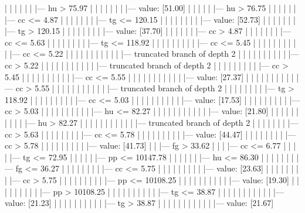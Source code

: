 \documentclass[UTF8, a4paper]{ctexart}
\begin{document}
|   |   |   |   |   |   |--- hu >  75.97
|   |   |   |   |   |   |   |--- value: [51.00]
|   |   |   |   |   |--- hu >  76.75
|   |   |   |   |   |   |--- cc <= 4.87
|   |   |   |   |   |   |   |--- tg <= 120.15
|   |   |   |   |   |   |   |   |--- value: [52.73]
|   |   |   |   |   |   |   |--- tg >  120.15
|   |   |   |   |   |   |   |   |--- value: [37.70]
|   |   |   |   |   |   |--- cc >  4.87
|   |   |   |   |   |   |   |--- cc <= 5.63
|   |   |   |   |   |   |   |   |--- tg <= 118.92
|   |   |   |   |   |   |   |   |   |--- cc <= 5.45
|   |   |   |   |   |   |   |   |   |   |--- cc <= 5.22
|   |   |   |   |   |   |   |   |   |   |   |--- truncated branch of depth 2
|   |   |   |   |   |   |   |   |   |   |--- cc >  5.22
|   |   |   |   |   |   |   |   |   |   |   |--- truncated branch of depth 2
|   |   |   |   |   |   |   |   |   |--- cc >  5.45
|   |   |   |   |   |   |   |   |   |   |--- cc <= 5.55
|   |   |   |   |   |   |   |   |   |   |   |--- value: [27.37]
|   |   |   |   |   |   |   |   |   |   |--- cc >  5.55
|   |   |   |   |   |   |   |   |   |   |   |--- truncated branch of depth 2
|   |   |   |   |   |   |   |   |--- tg >  118.92
|   |   |   |   |   |   |   |   |   |--- cc <= 5.03
|   |   |   |   |   |   |   |   |   |   |--- value: [17.53]
|   |   |   |   |   |   |   |   |   |--- cc >  5.03
|   |   |   |   |   |   |   |   |   |   |--- hu <= 82.27
|   |   |   |   |   |   |   |   |   |   |   |--- value: [21.80]
|   |   |   |   |   |   |   |   |   |   |--- hu >  82.27
|   |   |   |   |   |   |   |   |   |   |   |--- truncated branch of depth 2
|   |   |   |   |   |   |   |--- cc >  5.63
|   |   |   |   |   |   |   |   |--- cc <= 5.78
|   |   |   |   |   |   |   |   |   |--- value: [44.47]
|   |   |   |   |   |   |   |   |--- cc >  5.78
|   |   |   |   |   |   |   |   |   |--- value: [41.73]
|   |   |--- fg >  33.62
|   |   |   |--- cc <= 6.77
|   |   |   |   |--- tg <= 72.95
|   |   |   |   |   |--- pp <= 10147.78
|   |   |   |   |   |   |--- hu <= 86.30
|   |   |   |   |   |   |   |--- fg <= 36.27
|   |   |   |   |   |   |   |   |--- cc <= 5.75
|   |   |   |   |   |   |   |   |   |--- value: [23.63]
|   |   |   |   |   |   |   |   |--- cc >  5.75
|   |   |   |   |   |   |   |   |   |--- pp <= 10108.25
|   |   |   |   |   |   |   |   |   |   |--- value: [19.30]
|   |   |   |   |   |   |   |   |   |--- pp >  10108.25
|   |   |   |   |   |   |   |   |   |   |--- tg <= 38.87
|   |   |   |   |   |   |   |   |   |   |   |--- value: [21.23]
|   |   |   |   |   |   |   |   |   |   |--- tg >  38.87
|   |   |   |   |   |   |   |   |   |   |   |--- value: [21.67]
\end{document}
